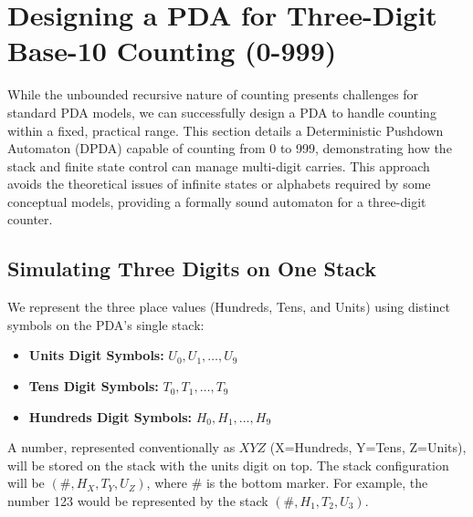 \documentclass[11pt]{article}
\begin{document}
\section{Designing a PDA for Three-Digit Base-10 Counting (0-999)} \label{sec:designing_3digit_pda}

While the unbounded recursive nature of counting presents challenges for standard PDA models, we can successfully design a PDA to handle counting within a fixed, practical range. This section details a Deterministic Pushdown Automaton (DPDA) capable of counting from 0 to 999, demonstrating how the stack and finite state control can manage multi-digit carries. This approach avoids the theoretical issues of infinite states or alphabets required by some conceptual models, providing a formally sound automaton for a three-digit counter.

\subsection{Simulating Three Digits on One Stack}
We represent the three place values (Hundreds, Tens, and Units) using distinct symbols on the PDA's single stack:
\begin{itemize}
    \item \textbf{Units Digit Symbols:} $U_0, U_1, \ldots, U_9$
    \item \textbf{Tens Digit Symbols:} $T_0, T_1, \ldots, T_9$
    \item \textbf{Hundreds Digit Symbols:} $H_0, H_1, \ldots, H_9$
\end{itemize}
A number, represented conventionally as $XYZ$ (X=Hundreds, Y=Tens, Z=Units), will be stored on the stack with the units digit on top. The stack configuration will be $(\#, H_X, T_Y, U_Z)$, where $\#$ is the bottom marker. For example, the number 123 would be represented by the stack $(\#, H_1, T_2, U_3)$.
\end{document}
